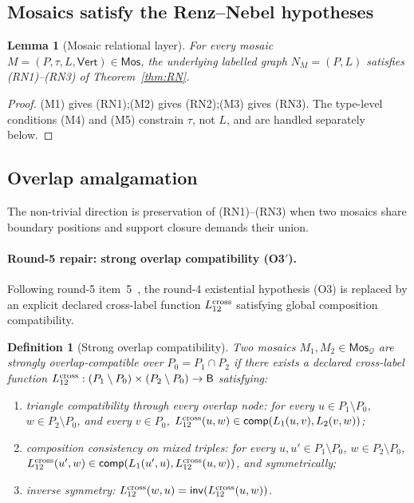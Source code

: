 \documentclass[11pt]{article}
\newtheorem{lemma}[theorem]{Lemma}
\newtheorem{definition}[theorem]{Definition}
\newcommand{\Base}{\mathsf{B}}
\newcommand{\Inv}{\mathsf{inv}}
\newcommand{\comp}{\mathsf{comp}}
\newcommand{\Q}{\mathcal Q}
\newcommand{\Mos}{\mathsf{Mos}}
\newcommand{\Vrt}{\mathsf{Vert}}
\begin{document}
\subsection{Mosaics satisfy the Renz--Nebel hypotheses}
\label{ssec:mosaic-to-rn}

\begin{lemma}[Mosaic relational layer]\label{lem:M-to-RN}
For every mosaic $M=(P,\tau,L,\Vrt)\in\Mos$, the underlying labelled
graph $N_M=(P,L)$ satisfies (RN1)--(RN3) of
Theorem~\ref{thm:RN}.
\end{lemma}

\begin{proof}
(M1) gives (RN1);\@ (M2) gives (RN2);\@ (M3) gives (RN3).  The
type-level conditions (M4) and (M5) constrain $\tau$, not $L$, and
are handled separately below.
\end{proof}

\subsection{Overlap amalgamation}
\label{ssec:overlap}

The non-trivial direction is preservation of (RN1)--(RN3) when two
mosaics share boundary positions and support closure demands their
union.

\paragraph{Round-5 repair: strong overlap compatibility (O3$'$).}
Following round-5 item~5~\cite{GPT55Round5Review}, the round-4
existential hypothesis (O3) is replaced by an explicit declared
cross-label function $L_{12}^{\rm cross}$ satisfying global
composition compatibility.

\begin{definition}[Strong overlap compatibility]\label{def:strong-overlap}
Two mosaics $M_1,M_2\in\Mos_\Q$ are \emph{strongly
overlap-compatible} over $P_0=P_1\cap P_2$ if there exists a
declared cross-label function
\(
  L_{12}^{\rm cross}:(P_1\setminus P_0)\times(P_2\setminus P_0)
                     \to\Base
\)
satisfying:
\begin{enumerate}[label=\textnormal{(O3$'$.\alph*)},leftmargin=3em]
  \item triangle compatibility through every overlap node: for
    every $u\in P_1\setminus P_0$, $w\in P_2\setminus P_0$, and
    every $v\in P_0$, $L_{12}^{\rm cross}(u,w)\in\comp(L_1(u,v),L_2(v,w))$;
  \item composition consistency on mixed triples: for every
    $u,u'\in P_1\setminus P_0$, $w\in P_2\setminus P_0$,
    $L_{12}^{\rm cross}(u',w)\in\comp(L_1(u',u),L_{12}^{\rm cross}(u,w))$,
    and symmetrically;
  \item inverse symmetry: $L_{12}^{\rm cross}(w,u)=\Inv(L_{12}^{\rm cross}(u,w))$.
\end{enumerate}
\end{definition}
\end{document}

